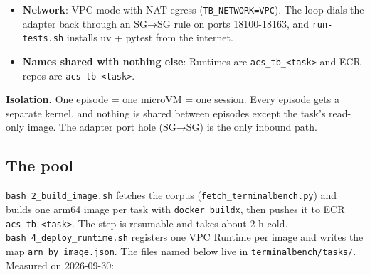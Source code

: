 \documentclass[
  paper=a4,
  ,captions=tableheading
]{scrartcl}
\begin{document}
\begin{itemize}
  They are listed in \texttt{terminalbench/tasks/images.csv} and left
  out of the data. Multi-container tasks are skipped, since one image
  maps to one sandbox.
\item
  \textbf{Network}: VPC mode with NAT egress (\texttt{TB\_NETWORK=VPC}).
  The loop dials the adapter back through an SG→SG rule on ports
  18100-18163, and \texttt{run-tests.sh} installs uv + pytest from the
  internet.
\item
  \textbf{Names shared with nothing else}: Runtimes are
  \texttt{acs\_tb\_\textless{}task\textgreater{}} and ECR repos are
  \texttt{acs-tb-\textless{}task\textgreater{}}.
\end{itemize}

\textbf{Isolation.} One episode = one microVM = one session. Every
episode gets a separate kernel, and nothing is shared between episodes
except the task's read-only image. The adapter port hole (SG→SG) is the
only inbound path.

\hypertarget{the-pool}{%
\subsection{The pool}\label{the-pool}}

\texttt{bash\ 2\_build\_image.sh} fetches the corpus
(\texttt{fetch\_terminalbench.py}) and builds one arm64 image per task
with \texttt{docker\ buildx}, then pushes it to ECR
\texttt{acs-tb-\textless{}task\textgreater{}}. The step is resumable and
takes about 2 h cold. \texttt{bash\ 4\_deploy\_runtime.sh} registers one
VPC Runtime per image and writes the map \texttt{arn\_by\_image.json}.
The files named below live in \texttt{terminalbench/tasks/}. Measured on
2026-09-30:
\end{document}
